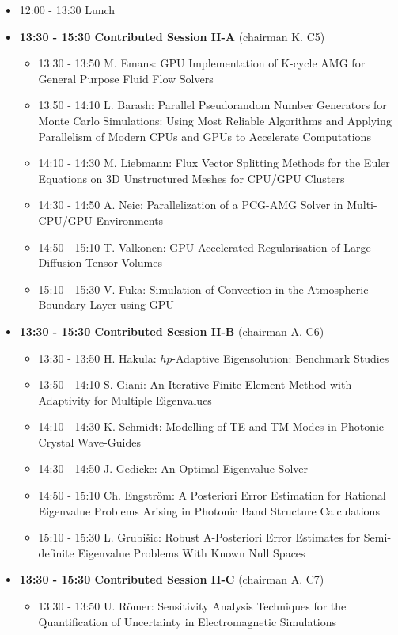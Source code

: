 \documentclass[10pt, A4]{article}%
\begin{document}
\begin{itemize}
  \item 12:00 - 13:30 Lunch
  \item {\bf 13:30 - 15:30 Contributed Session II-A} (chairman K. C5) 
  \begin{itemize}
    \item 13:30 - 13:50 M. Emans: GPU Implementation of K-cycle AMG for General Purpose Fluid Flow Solvers
    \item 13:50 - 14:10 L. Barash: Parallel Pseudorandom Number Generators for Monte Carlo Simulations: Using Most Reliable Algorithms and Applying Parallelism of Modern CPUs and GPUs to Accelerate Computations
    \item 14:10 - 14:30 M. Liebmann: Flux Vector Splitting Methods for the Euler Equations on 3D Unstructured Meshes for CPU/GPU Clusters
    \item 14:30 - 14:50 A. Neic: Parallelization of a PCG-AMG Solver in Multi-CPU/GPU Environments
    \item 14:50 - 15:10 T. Valkonen: GPU-Accelerated Regularisation of Large Diffusion Tensor Volumes
    \item 15:10 - 15:30 V. Fuka: Simulation of Convection in the Atmospheric Boundary Layer using GPU
  \end{itemize}
  \item {\bf 13:30 - 15:30 Contributed Session II-B} (chairman A. C6) 
  \begin{itemize}
    \item 13:30 - 13:50 H. Hakula: $hp$-Adaptive Eigensolution: Benchmark Studies
    \item 13:50 - 14:10 S. Giani: An Iterative Finite Element Method with Adaptivity for Multiple Eigenvalues
    \item 14:10 - 14:30 K. Schmidt: Modelling of TE and TM Modes in Photonic Crystal Wave-Guides
    \item 14:30 - 14:50 J. Gedicke: An Optimal Eigenvalue Solver
    \item 14:50 - 15:10 Ch. Engstr\"{o}m: A Posteriori Error Estimation for Rational Eigenvalue Problems Arising in Photonic Band Structure Calculations
    \item 15:10 - 15:30 L. Grubi\v{s}ic: Robust A-Posteriori Error Estimates for Semi-definite Eigenvalue Problems With Known Null Spaces
  \end{itemize}
    \item {\bf 13:30 - 15:30 Contributed Session II-C} (chairman A. C7) 
  \begin{itemize}
    \item 13:30 - 13:50 U. R\"{o}mer: Sensitivity Analysis Techniques for the Quantification of Uncertainty in Electromagnetic Simulations

\end{itemize}
\end{itemize}
\end{document}
